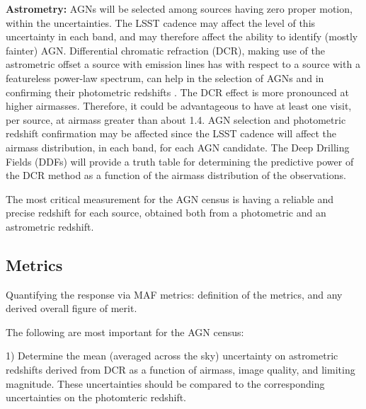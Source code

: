 
{\bf Astrometry:} AGNs will be selected among sources having zero
proper motion, within the uncertainties. The LSST cadence may affect
the level of this uncertainty in each band, and may therefore affect
the ability to identify (mostly fainter) AGN.
%
Differential chromatic refraction (DCR), making use of the astrometric
offset a source with emission lines has with respect to a source with
a featureless power-law spectrum, can help in the selection of AGNs
and in confirming their photometric redshifts
\citep{KaczmarczikEtal2009}. The DCR effect is more pronounced at
higher airmasses. Therefore, it could be advantageous to have at least one
visit, per source, at airmass greater than about 1.4. AGN selection
and photometric redshift confirmation may be affected since the LSST
cadence will affect the airmass distribution, in each band, for each
AGN candidate.
%
The Deep Drilling Fields (DDFs) will provide a truth table for determining
the predictive power of the DCR method as a function of the airmass
distribution of the observations.

The most critical measurement for the AGN census is having a reliable
and precise redshift for each source, obtained both from a photometric
and an astrometric redshift.




\subsection{Metrics}
\label{sec:\secname:metrics}

Quantifying the response via MAF metrics: definition of the metrics,
and any derived overall figure of merit.

The following are most important for the AGN census:

1) Determine the mean (averaged across the sky) uncertainty on astrometric
redshifts derived from DCR as a function of airmass, image quality, and
limiting magnitude. These uncertainties should be compared to the
corresponding uncertainties on the photomteric redshift.

